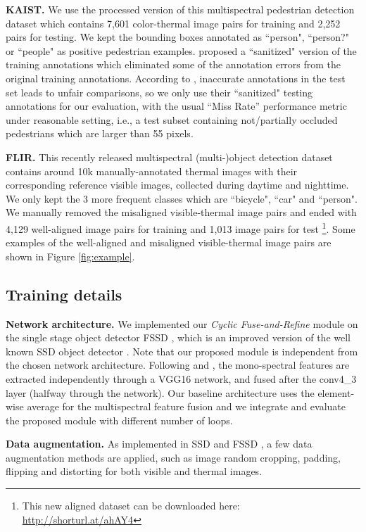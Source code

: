 \documentclass{article}
\begin{document}
\noindent
\textbf{KAIST.} We use the processed version of this multispectral pedestrian detection dataset which contains 7,601 color-thermal image pairs for training and 2,252 pairs for testing. We kept the bounding boxes annotated as ``person", ``person?" or ``people" as positive pedestrian examples. \cite{MSDS} proposed a ``sanitized" version of the training annotations which eliminated some of the annotation errors from the original training annotations.
According to \cite{TestAnno}, inaccurate annotations in the test set leads to unfair comparisons, so we only use their ``sanitized" testing annotations for our evaluation, with the usual ``Miss Rate'' performance metric under reasonable setting, i.e., a test subset containing not/partially occluded pedestrians which are larger than 55 pixels.

\noindent
\textbf{FLIR.} This recently released multispectral (multi-)object detection dataset contains around 10k manually-annotated thermal images with their corresponding reference visible images, collected during daytime and nighttime. We only kept the 3 more frequent classes which are ``bicycle", ``car" and ``person". We manually removed the misaligned visible-thermal image pairs and ended with 4,129 well-aligned image pairs for training and 1,013 image pairs for test \footnote{This new aligned dataset can be downloaded here: \url{http://shorturl.at/ahAY4}}. Some examples of the well-aligned and misaligned visible-thermal image pairs are shown in Figure \ref{fig:example}.

\subsection{Training details}

\noindent
\textbf{Network architecture.} We implemented our \textit{Cyclic Fuse-and-Refine} module on the single stage object detector FSSD \cite{FSSD}, which is an improved version of the well known SSD object detector \cite{SSD}. Note that our proposed module is independent from the chosen network architecture. Following \cite{TestAnno} and \cite{Illumination-aware-li}, the mono-spectral features are extracted independently through a VGG16 \cite{VGG} network, and fused after the conv4\_3 layer (halfway through the network). Our baseline architecture uses the element-wise average for the multispectral feature fusion and we integrate and evaluate the proposed module with different number of loops.

\noindent
\textbf{Data augmentation.} As implemented in SSD \cite{SSD} and FSSD \cite{FSSD}, a few data augmentation methods are applied, such as image random cropping, padding, flipping and distorting for both visible and thermal images. 
\end{document}
